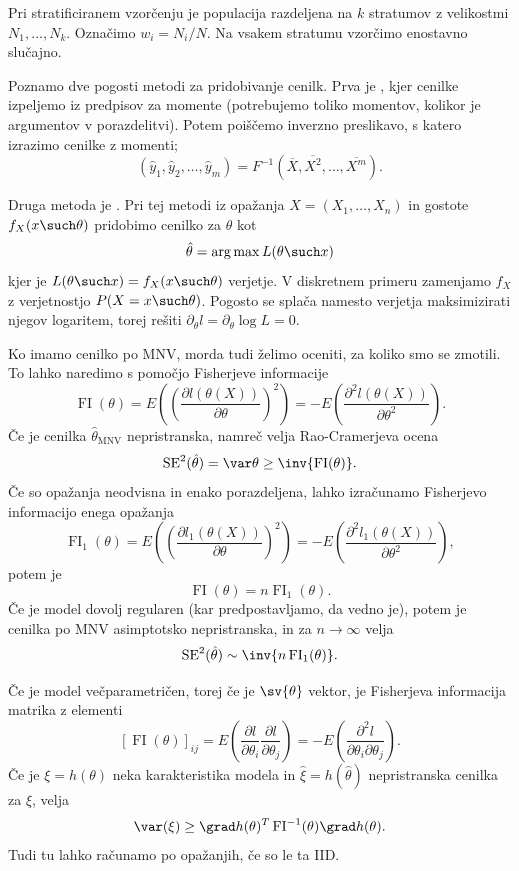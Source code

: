 Pri stratificiranem vzorčenju je populacija razdeljena na $k$ stratumov z
velikostmi $N_1, \ldots, N_k$.
Označimo $w_i = N_i / N$.
Na vsakem stratumu vzorčimo enostavno slučajno.

Poznamo dve pogosti metodi za pridobivanje cenilk.
Prva je , kjer cenilke izpeljemo iz predpisov za momente
(potrebujemo toliko momentov, kolikor je argumentov v porazdelitvi).
Potem poiščemo inverzno preslikavo, s katero izrazimo cenilke z momenti;
\[
  (\hat{y}_1, \hat{y}_2, \ldots, \hat{y}_m) = F^{-1}(\overline{X}, \overline{X^2}, \ldots,
  \overline{X^m}).
\]

Druga metoda je .
Pri tej metodi iz opažanja $X = (X_1, \ldots, X_n)$ in gostote $f_X(x \such
\theta)$ pridobimo cenilko za $\theta$ kot
\[
  \hat{\theta} = \operatorname{arg\,max} L(\theta \such x)
\]
kjer je $L(\theta \such x) = f_X(x \such \theta)$ verjetje.
V diskretnem primeru zamenjamo $f_X$ z verjetnostjo $P(X = x \such \theta)$.
Pogosto se splača namesto verjetja maksimizirati njegov logaritem, torej
rešiti $\partial_\theta l = \partial_\theta \log L = 0$.

\newcommand{\FI}{\operatorname{FI}}

Ko imamo cenilko po MNV, morda tudi želimo oceniti, za koliko smo se zmotili.
To lahko naredimo s pomočjo Fisherjeve informacije
\[
  \FI(\theta) = E\!\left( \left( \frac{\partial l(\theta(X))}{\partial \theta}
	\right)^2 \right)
  = - E\!\left( \frac{\partial^2 l(\theta(X))}{\partial \theta^2} \right).
\]
Če je cenilka $\hat{\theta}_{\text{MNV}}$ nepristranska, namreč velja
Rao-Cramerjeva ocena
\[
  \text{SE}^2(\hat{\theta}) = \var \theta
  \ge \inv{\FI(\theta)}.
\]
Če so opažanja neodvisna in enako porazdeljena, lahko izračunamo Fisherjevo
informacijo enega opažanja
\[
  \FI_1(\theta) = E\!\left( \left( \frac{\partial l_1(\theta(X))}{\partial \theta}
	\right)^2 \right)
  = - E\!\left( \frac{\partial^2 l_1(\theta(X))}{\partial \theta^2} \right),
\]
potem je
\[
  \FI(\theta) = n \FI_1(\theta).
\]
Če je model dovolj regularen (kar predpostavljamo, da vedno je), potem je
cenilka po MNV asimptotsko nepristranska, in za $n \to \infty$ velja
\[
  \text{SE}^2(\hat{\theta}) \sim \inv{n \FI_1(\theta)}.
\]

Če je model večparametričen, torej če je $\sv{\theta}$ vektor, je Fisherjeva
informacija matrika z elementi
\[
  \left[ \FI(\theta) \right]_{ij} = E\!\left( \frac{\partial l}{\partial
	  \theta_i} \frac{\partial l}{\partial \theta_j} \right)
  = -E\!\left( \frac{\partial^2 l}{\partial \theta_i \partial \theta_j} \right).
\]
Če je $\xi = h(\theta)$ neka karakteristika modela in $\hat{\xi} =
h(\hat{\theta})$ nepristranska cenilka za $\xi$, velja
\[
  \var(\xi) \ge \grad h(\theta)^T \FI^{-1}(\theta) \grad h(\theta).
\]
Tudi tu lahko računamo po opažanjih, če so le ta IID\@.

